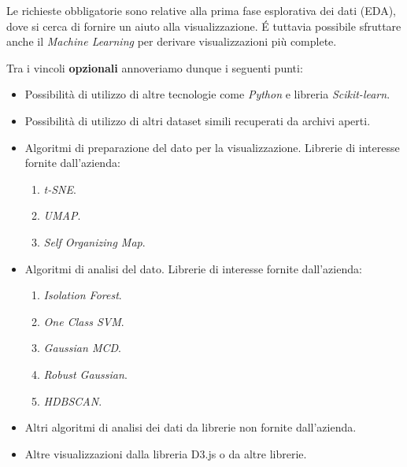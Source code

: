 \noindent
Le richieste obbligatorie sono relative alla prima fase esplorativa dei dati (EDA), dove si cerca di fornire un aiuto alla visualizzazione. \' E tuttavia possibile sfruttare anche il \textit{Machine Learning} per derivare visualizzazioni più complete.

\noindent Tra i vincoli \textbf{opzionali} annoveriamo dunque i seguenti punti:
\begin{itemize}
\item Possibilità di utilizzo di altre tecnologie come \textit{Python} e libreria \textit{Scikit-learn}. 
\item Possibilità di utilizzo di altri dataset simili recuperati da archivi aperti.
\item Algoritmi di preparazione del dato per la visualizzazione. Librerie di interesse fornite dall'azienda:
	\begin{enumerate}
                    \item \textit{t-SNE}.
                    \item \textit{UMAP}.
                    \item \textit{Self Organizing Map}.
	\end{enumerate}
\item Algoritmi di analisi del dato. Librerie di interesse fornite dall'azienda:
	\begin{enumerate}
                    \item \textit{Isolation Forest}.
                    \item \textit{One Class SVM}.
                    \item \textit{Gaussian MCD}.
                    \item \textit{Robust Gaussian}.
                    \item \textit{HDBSCAN}.
	\end{enumerate}
\item Altri algoritmi di analisi dei dati da librerie non fornite dall’azienda.
\item Altre visualizzazioni dalla libreria D3.js o da altre librerie.
\end{itemize}



